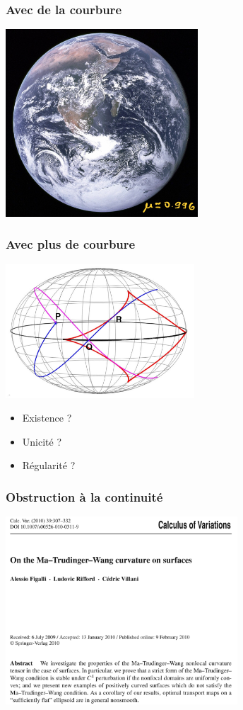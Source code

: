 \documentclass[9pt]{beamer}
\begin{document}
\begin{frame}
\frametitle{\bf Avec de la courbure}
 
\centering \includegraphics[height=7.0cm]{terre}

\end{frame}

\begin{frame}
\frametitle{\bf Avec plus de courbure}
 
\centering \includegraphics[height=5.0cm]{ellip}

\begin{itemize}
  \item Existence ?
  \item Unicit\'e ?
  \item R\'egularit\'e ?
\end{itemize}

\end{frame}

\begin{frame}
\frametitle{\bf Obstruction \`a la continuit\'e}
 
\centering \includegraphics[height=7.0cm]{figal1}

\end{frame}
\end{document}
